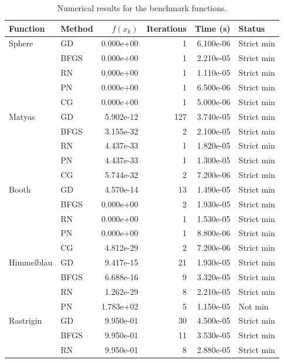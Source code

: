 \begin{table}[ht]
    \centering
    \caption{Numerical results for the benchmark functions.}
    \label{tab:numerical-results}
    \small
    \begin{tabular}{llrrrl}
        \hline
        Function & Method & $f(x_k)$ & Iterations & Time (s) & Status \\
        \hline
        Sphere & GD & 0.000e+00 & 1 & 6.100e-06 & Strict min \\
         & BFGS & 0.000e+00 & 1 & 2.210e-05 & Strict min \\
         & RN & 0.000e+00 & 1 & 1.110e-05 & Strict min \\
         & PN & 0.000e+00 & 1 & 6.500e-06 & Strict min \\
         & CG & 0.000e+00 & 1 & 5.000e-06 & Strict min \\
        \hline
        Matyas & GD & 5.902e-12 & 127 & 3.740e-05 & Strict min \\
         & BFGS & 3.155e-32 & 2 & 2.100e-05 & Strict min \\
         & RN & 4.437e-33 & 1 & 1.820e-05 & Strict min \\
         & PN & 4.437e-33 & 1 & 1.300e-05 & Strict min \\
         & CG & 5.744e-32 & 2 & 7.200e-06 & Strict min \\
        \hline
        Booth & GD & 4.570e-14 & 13 & 1.490e-05 & Strict min \\
         & BFGS & 0.000e+00 & 2 & 1.930e-05 & Strict min \\
         & RN & 0.000e+00 & 1 & 1.530e-05 & Strict min \\
         & PN & 0.000e+00 & 1 & 8.800e-06 & Strict min \\
         & CG & 4.812e-29 & 2 & 7.200e-06 & Strict min \\
        \hline
        Himmelblau & GD & 9.417e-15 & 21 & 1.930e-05 & Strict min \\
         & BFGS & 6.688e-16 & 9 & 3.320e-05 & Strict min \\
         & RN & 1.262e-29 & 8 & 2.210e-05 & Strict min \\
         & PN & 1.783e+02 & 5 & 1.150e-05 & Not min \\
        \hline
        Rastrigin & GD & 9.950e-01 & 30 & 4.500e-05 & Strict min \\
         & BFGS & 9.950e-01 & 11 & 3.530e-05 & Strict min \\
         & RN & 9.950e-01 & 8 & 2.880e-05 & Strict min \\

\end{tabular}
\end{table}
